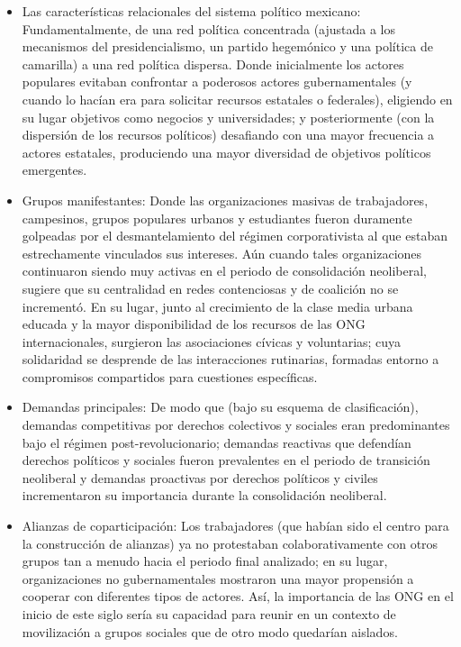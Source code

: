 \documentclass[letterpaper, 11pt]{book}
\theoremstyle{definition}
\theoremstyle{remark}
\begin{document}
\begin{itemize}
    \setlength\itemsep{0em}
    \item Las características relacionales del sistema político mexicano: 
    Fundamentalmente, de una red política concentrada (ajustada a los mecanismos del presidencialismo, un partido hegemónico y una política de camarilla) a una red política dispersa.  
    Donde inicialmente los actores populares evitaban confrontar a poderosos actores gubernamentales (y cuando lo hacían era para solicitar recursos estatales o federales), eligiendo en su lugar objetivos como negocios y universidades; y posteriormente (con la dispersión de los recursos políticos) desafiando con una mayor frecuencia a actores estatales, produciendo una mayor diversidad de objetivos políticos emergentes. 
    \item Grupos manifestantes: 
    Donde las organizaciones masivas de trabajadores, campesinos, grupos populares urbanos y estudiantes fueron duramente golpeadas por el desmantelamiento del régimen corporativista al que estaban estrechamente vinculados sus intereses. 
    Aún cuando tales organizaciones continuaron siendo muy activas en el periodo de consolidación neoliberal, sugiere que su centralidad en redes contenciosas y de coalición no se incrementó. 
    En su lugar, junto al crecimiento de la clase media urbana educada y la mayor disponibilidad de los recursos de las ONG internacionales, surgieron las asociaciones cívicas y voluntarias; cuya solidaridad se desprende de las interacciones rutinarias, formadas entorno a compromisos compartidos para cuestiones específicas. 
    \item Demandas principales: 
    De modo que (bajo su esquema de clasificación), demandas competitivas por derechos colectivos y sociales eran predominantes bajo el régimen post-revolucionario; demandas reactivas que defendían derechos políticos y sociales fueron prevalentes en el periodo de transición neoliberal y demandas proactivas por derechos políticos y civiles incrementaron su importancia durante la consolidación neoliberal. 
    \item Alianzas de coparticipación: 
    Los trabajadores (que habían sido el centro para la construcción de alianzas) ya no protestaban colaborativamente con otros grupos tan a menudo hacia el periodo final analizado; en su lugar, organizaciones no gubernamentales mostraron una mayor propensión a cooperar con diferentes tipos de actores. 
    Así, la importancia de las ONG en el inicio de este siglo sería su capacidad para reunir en un contexto de movilización a grupos sociales que de otro modo quedarían aislados. 
\end{itemize}
\end{document}
